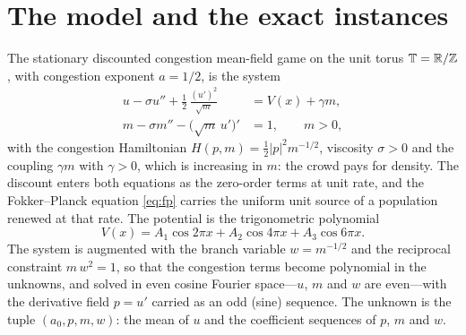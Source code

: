 \documentclass[11pt]{article}
\newcommand{\Torus}{\mathbb{T}}
\begin{document}
\section{The model and the exact instances}\label{sec:model}

The stationary discounted congestion mean-field game on the unit torus
$\Torus=\R/\Z$, with congestion exponent $a=1/2$, is the system
\begin{align}
u-\sigma u''+\tfrac12\,\frac{(u')^2}{\sqrt m} &= V(x)+\gamma m, \label{eq:hjb}\\
m-\sigma m''-\bigl(\sqrt m\,u'\bigr)' &= 1, \qquad m>0, \label{eq:fp}
\end{align}
with the congestion Hamiltonian $H(p,m)=\tfrac12|p|^2m^{-1/2}$, viscosity
$\sigma>0$ and the coupling $\gamma m$ with $\gamma>0$, which is increasing in
$m$: the crowd pays for density. The discount enters both equations as the
zero-order terms at unit rate, and the Fokker--Planck equation \eqref{eq:fp}
carries the uniform unit source of a population renewed at that rate. The
potential is the trigonometric polynomial
\begin{equation}\label{eq:V}
V(x)=A_1\cos 2\pi x+A_2\cos 4\pi x+A_3\cos 6\pi x .
\end{equation}
The system is augmented with the branch variable $w=m^{-1/2}$ and the
reciprocal constraint $m\,w^2=1$, so that the congestion terms become
polynomial in the unknowns, and solved in even cosine Fourier space---$u$, $m$
and $w$ are even---with the derivative field $p=u'$ carried as an odd (sine)
sequence. The unknown is the tuple $(a_0,p,m,w)$: the mean of $u$ and the
coefficient sequences of $p$, $m$ and $w$.
\end{document}
